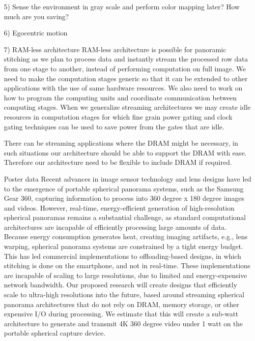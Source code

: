 5) Sense the environment in gray scale and perform color mapping later? How much are you saving? 
 
 6) Egocentric motion 

7) RAM-less architecture
RAM-less architecture is possible for panoramic stitching as we plan to process data and instantly stream the processed row data from one stage to another, instead of performing computation on full image.  We need to make the computation stages generic so that it can be extended to other applications with the use of same hardware resources. We also need to work on how to program the computing units and coordinate communication between computing stages. When we generalize streaming architectures we may create idle resources in computation stages for which fine grain power gating and clock gating techniques can be used to save power from the gates that are idle. 

There can be streaming applications where the DRAM might be necessary, in such situations our architecture should be able to support the DRAM with ease. Therefore our architecture need to be flexible to include DRAM if required.

Poster data \newline
Recent advances in image sensor technology and lens designs have led to the emergence of portable spherical panorama systems, such as the Samsung Gear 360, capturing information to process into 360 \text degree x 180 \text degree images and videos. However, real-time, energy-efficient generation of
high-resolution spherical panoramas remains a substantial challenge, as standard
computational architectures are incapable of efficiently processing large amounts of data.
Because energy consumption generates heat, creating imaging artifacts, e.g., lens warping,
spherical panorama systems are constrained by a tight energy budget. This has led commercial
implementations to offloading-based designs, in which stitching is done on the smartphone, and
not in real-time. These implementations are incapable of scaling to large resolutions, due to
limited and energy-expensive network bandwidth. Our proposed research will create designs
that efficiently scale to ultra-high resolutions into the future, based around streaming spherical
panorama architectures that do not rely on DRAM, memory storage, or other expensive I/O
during processing. We estimate that this will create a sub-watt architecture to generate and
transmit 4K 360 \text degree video under 1 watt on the portable spherical capture device. \newline

